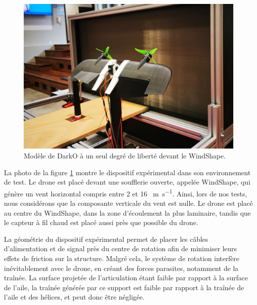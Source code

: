 \begin{figure}[!ht]
    \includegraphics[trim=0cm 5cm 0cm 6cm,clip,width=1\columnwidth]{figures/real_test_bench-min.jpg}
    \caption{Modèle de DarkO à un seul degré de liberté devant le WindShape.}
    \label{fig:real_test_bench}
\end{figure}
La photo de la figure \ref{fig:real_test_bench} montre le dispositif expérimental dans son environnement de test. Le drone est placé devant une soufflerie ouverte, appelée WindShape, qui génère un vent horizontal compris entre 2 et 16 \SI{}{\meter\per\second}. Ainsi, lors de nos tests, nous considérons que la composante verticale du vent est nulle. Le drone est placé au centre du WindShape, dans la zone d'écoulement la plus laminaire, tandis que le capteur à fil chaud est placé aussi près que possible du drone. 

La géométrie du dispositif expérimental permet de placer les câbles d'alimentation et de signal près du centre de rotation afin de minimiser leurs effets de friction sur la structure. Malgré cela, le système de rotation interfère inévitablement avec le drone, en créant des forces parasites, notamment de la traînée. La surface projetée de l'articulation étant faible par rapport à la surface de l'aile, la traînée générée par ce support est faible par rapport à la traînée de l'aile et des hélices, et peut donc être négligée.

